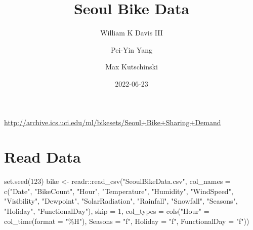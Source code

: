 \documentclass[
]{article}
\title{Seoul Bike Data}
\author{William K Davis III \and Pei-Yin Yang \and Max Kutschinski}
\date{2022-06-23}
\newenvironment{Shaded}{\begin{snugshade}}{\end{snugshade}}
\newcommand{\AttributeTok}[1]{\textcolor[rgb]{0.77,0.63,0.00}{#1}}
\newcommand{\DecValTok}[1]{\textcolor[rgb]{0.00,0.00,0.81}{#1}}
\newcommand{\FunctionTok}[1]{\textcolor[rgb]{0.00,0.00,0.00}{#1}}
\newcommand{\NormalTok}[1]{#1}
\newcommand{\OtherTok}[1]{\textcolor[rgb]{0.56,0.35,0.01}{#1}}
\newcommand{\SpecialCharTok}[1]{\textcolor[rgb]{0.00,0.00,0.00}{#1}}
\newcommand{\StringTok}[1]{\textcolor[rgb]{0.31,0.60,0.02}{#1}}
\begin{document}
\maketitle

\url{http://archive.ics.uci.edu/ml/bikesets/Seoul+Bike+Sharing+Demand}

\hypertarget{read-data}{%
\section{Read Data}\label{read-data}}

\begin{Shaded}
\begin{Highlighting}[]
\FunctionTok{set.seed}\NormalTok{(}\DecValTok{123}\NormalTok{)}
\NormalTok{bike }\OtherTok{\textless{}{-}}\NormalTok{ readr}\SpecialCharTok{::}\FunctionTok{read\_csv}\NormalTok{(}\StringTok{"SeoulBikeData.csv"}\NormalTok{,}
                        \AttributeTok{col\_names =} \FunctionTok{c}\NormalTok{(}\StringTok{"Date"}\NormalTok{,}
                                      \StringTok{"BikeCount"}\NormalTok{,}
                                      \StringTok{"Hour"}\NormalTok{,}
                                      \StringTok{"Temperature"}\NormalTok{,}
                                      \StringTok{"Humidity"}\NormalTok{,}
                                      \StringTok{"WindSpeed"}\NormalTok{,}
                                      \StringTok{"Visibility"}\NormalTok{,}
                                      \StringTok{"Dewpoint"}\NormalTok{,}
                                      \StringTok{"SolarRadiation"}\NormalTok{,}
                                      \StringTok{"Rainfall"}\NormalTok{,}
                                      \StringTok{"Snowfall"}\NormalTok{,}
                                      \StringTok{"Seasons"}\NormalTok{,}
                                      \StringTok{"Holiday"}\NormalTok{,}
                                      \StringTok{"FunctionalDay"}\NormalTok{),}
                        \AttributeTok{skip =} \DecValTok{1}\NormalTok{,}
                        \AttributeTok{col\_types =} \FunctionTok{cols}\NormalTok{(}\StringTok{"Hour"} \OtherTok{=} \FunctionTok{col\_time}\NormalTok{(}\AttributeTok{format =} \StringTok{"\%H"}\NormalTok{),}
                                         \AttributeTok{Seasons =} \StringTok{"f"}\NormalTok{, }
                                         \AttributeTok{Holiday =} \StringTok{"f"}\NormalTok{,}
                                         \AttributeTok{FunctionalDay =} \StringTok{"f"}\NormalTok{))}
\end{Highlighting}
\end{Shaded}
\end{document}
